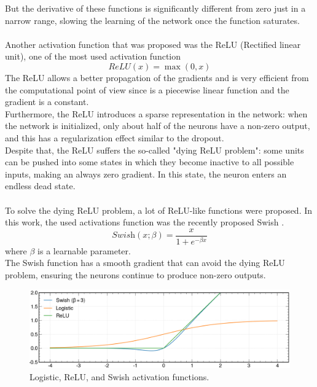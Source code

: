 But the derivative of these functions is significantly different from zero just in a narrow range, slowing the learning of the network once the function saturates.\\
\\
Another activation function that was proposed was the ReLU (Rectified linear unit)\cite{FredAgarap2018DeepReLU}, one of the most used activation function
\begin{equation}
    \textit{ReLU}(x)=\max(0,x)
\end{equation}
The ReLU allows a better propagation of the gradients and is very efficient from the computational point of view since is a piecewise linear function and the gradient is a constant.\\
Furthermore, the ReLU introduces a sparse representation in the network:
when the network is initialized, only about half of the neurons have a non-zero output, and this has a regularization effect similar to the dropout.\\
Despite that, the ReLU suffers the so-called "dying ReLU problem": some units can be pushed into some states in which they become inactive to all possible inputs, making an always zero gradient. In this state, the neuron enters an endless dead state.\\
\\
To solve the dying ReLU problem, a lot of ReLU-like functions were proposed. In this work, the used activations function was the recently proposed Swish \cite{Ramachandran2017SearchingFunctions}. 
\begin{equation}
    \textit{Swish}(x; \beta)=\frac{x}{1+e^{-\beta x}}
\end{equation}
where $\beta$ is a learnable parameter.\\
The Swish function has a smooth gradient that can avoid the dying ReLU problem, ensuring the neurons continue to produce non-zero outputs.

\begin{figure}[H]
    \centering
    \includegraphics[width=0.85\linewidth]{fig//chap05-stats/act.png}
    \caption{Logistic, ReLU, and Swish activation functions.}
    \label{fig:activation}
\end{figure}

